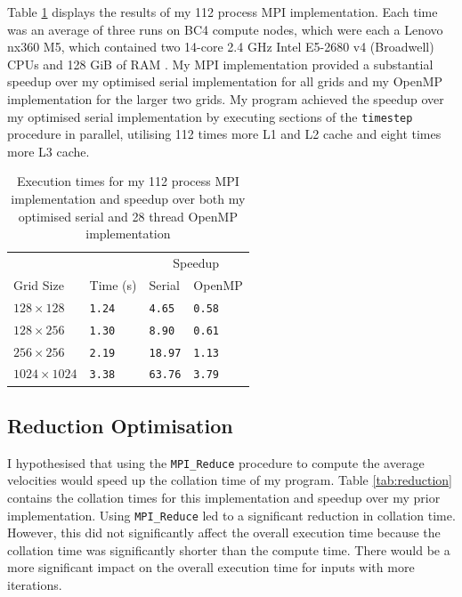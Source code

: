 \documentclass[twocolumn, a4paper]{article}
\begin{document}
Table \ref{tab:mpi} displays the results of my 112 process MPI implementation.
Each time was an average of three runs on BC4 compute nodes, which were each a Lenovo nx360 M5, which contained two 14-core 2.4 GHz Intel E5-2680 v4 (Broadwell) CPUs and 128 GiB of RAM \cite{bcp4}.
My MPI implementation provided a substantial speedup over my optimised serial implementation for all grids and my OpenMP implementation for the larger two grids.
My program achieved the speedup over my optimised serial implementation by executing sections of the \texttt{timestep} procedure in parallel, utilising 112 times more L1 and L2 cache and eight times more L3 cache.

\begin{table}[htbp]
  \begin{center}
  \caption{Execution times for my 112 process MPI implementation and speedup over both my optimised serial and 28 thread OpenMP implementation}\label{tab:mpi}
  \begin{tabular}[t]{l | l  l  l} 
      \hline\hline
      &&\multicolumn{2}{c}{Speedup}\\
      \cline{3-4}
      Grid Size&Time (s)&Serial&OpenMP\\
      \hline
      $128 \times 128$&\texttt{1.24}&\texttt{4.65}&\texttt{0.58}\\
      $128 \times 256$&\texttt{1.30}&\texttt{8.90}&\texttt{0.61}\\
      $256 \times 256$&\texttt{2.19}&\texttt{18.97}&\texttt{1.13}\\
      $1024 \times 1024$&\texttt{3.38}&\texttt{63.76}&\texttt{3.79}\\
      \hline
    \end{tabular}
  \end{center}
  \vspace{-1em}
\end{table}

\subsection{Reduction Optimisation}

I hypothesised that using the \texttt{MPI\_Reduce} procedure to compute the average velocities would speed up the collation time of my program.
Table \ref{tab:reduction} contains the collation times for this implementation and speedup over my prior implementation.
Using \texttt{MPI\_Reduce} led to a significant reduction in collation time.
However, this did not significantly affect the overall execution time because the collation time was significantly shorter than the compute time.
There would be a more significant impact on the overall execution time for inputs with more iterations.
\end{document}
